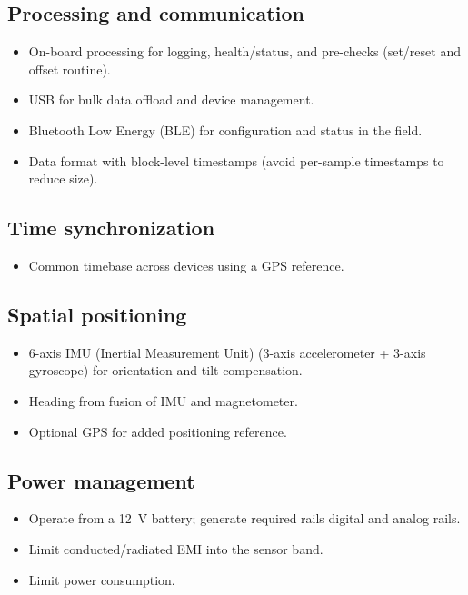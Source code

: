 \documentclass[11pt]{article}
\begin{document}
\subsection{Processing and communication}
\begin{itemize}
  \item On-board processing for logging, health/status, and pre-checks (set/reset and offset 
  routine).
  \item USB for bulk data offload and device management.
  \item Bluetooth Low Energy (BLE) for configuration and status in the field.
  \item Data format with block-level timestamps (avoid per-sample timestamps to reduce size).
\end{itemize}

\subsection{Time synchronization}
\begin{itemize}
  \item Common timebase across devices using a GPS reference.
\end{itemize}

\subsection{Spatial positioning}
\begin{itemize}
  \item 6-axis IMU (Inertial Measurement Unit) (3-axis accelerometer + 3-axis gyroscope) 
  for orientation and tilt compensation.
  \item Heading from fusion of IMU and magnetometer.
  \item Optional GPS for added positioning reference.
\end{itemize}

\subsection{Power management}
\begin{itemize}
  \item Operate from a 12~V battery; generate required rails digital and analog rails.
  \item Limit conducted/radiated EMI into the sensor band.
  \item Limit power consumption.
\end{itemize}
\end{document}

